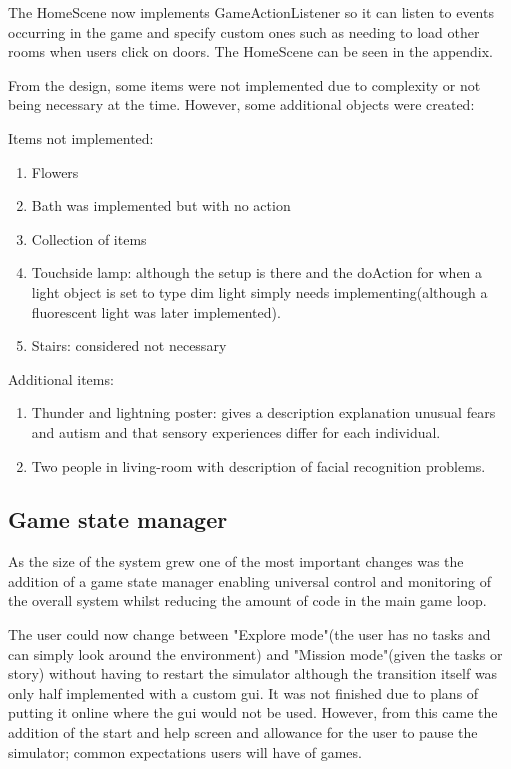 \documentclass[11pt]{report}
\begin{document}
The HomeScene now implements GameActionListener so it can listen to events occurring in the game and specify custom ones such as needing to load other rooms when users click on doors. The HomeScene can be seen in the appendix.

From the design, some items were not implemented due to complexity or not being necessary at the time. However, some additional objects were created:

Items not implemented:
\begin{enumerate}
\item Flowers
\item Bath was implemented but with no action
\item Collection of items
\item Touchside lamp: although the setup is there and the doAction for when a light object is set to type dim light simply needs implementing(although a fluorescent light was later implemented).
\item Stairs: considered not necessary
\end{enumerate}

Additional items:
\begin{enumerate}
\item Thunder and lightning poster: gives a description explanation unusual fears and autism and that sensory experiences differ for each individual. 
\item Two people in living-room with description of facial recognition problems.
\end{enumerate}


\subsection{Game state manager}

As the size of the system grew one of the most important changes was the addition of a game state manager enabling universal control and monitoring of the overall system whilst reducing the amount of code in the main game loop. 

The user could now change between "Explore mode"(the user has no tasks and can simply look around the environment) and "Mission mode"(given the tasks or story) without having to restart the simulator although the transition itself was only half implemented with a custom gui. It was not finished due to plans of putting it online where the gui would not be used. However, from this came the addition of the start and help screen and allowance for the user to pause the simulator; common expectations users will have of games.  
\end{document}

